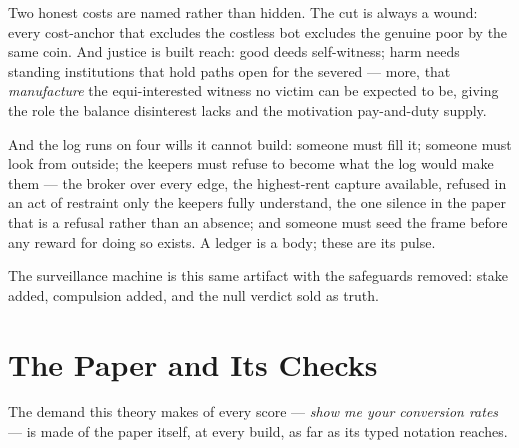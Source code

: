 \documentclass[../main_explainer]{subfiles}
\begin{document}
Two honest costs are named rather than hidden. The cut is always a wound: every
cost-anchor that excludes the costless bot excludes the genuine poor by the same coin.
And justice is built reach: good deeds self-witness; harm needs standing institutions
that hold paths open for the severed --- more, that \emph{manufacture} the
equi-interested witness no victim can be expected to be, giving the role the balance
disinterest lacks and the motivation pay-and-duty supply.

And the log runs on four wills it cannot build: someone must fill it; someone must look
from outside; the keepers must refuse to become what the log would make them --- the
broker over every edge, the highest-rent capture available, refused in an act of
restraint only the keepers fully understand, the one silence in the paper that is a
refusal rather than an absence; and someone must seed the frame before any reward for
doing so exists. A ledger is a body; these are its pulse.

The surveillance machine is this same artifact with the safeguards removed: stake added,
compulsion added, and the null verdict sold as truth.



\section{The Paper and Its Checks}
\label{sec:explainer:typed}

The demand this theory makes of every score --- \emph{show me your conversion rates} ---
is made of the paper itself, at every build, as far as its typed notation reaches.
\end{document}
